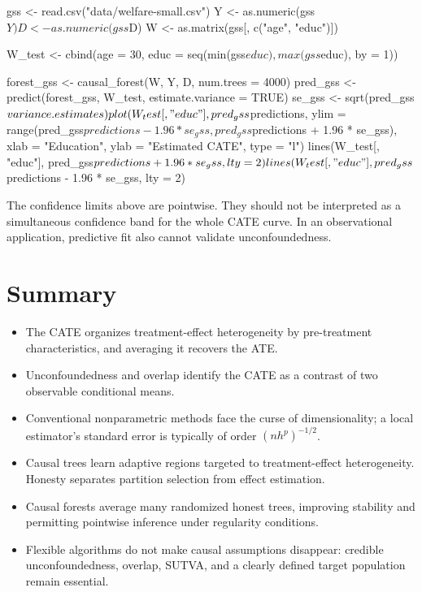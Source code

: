 \begin{rcode}
gss <- read.csv("data/welfare-small.csv")
Y <- as.numeric(gss$Y)
D <- as.numeric(gss$D)
W <- as.matrix(gss[, c("age", "educ")])

W_test <- cbind(age = 30,
                educ = seq(min(gss$educ), max(gss$educ), by = 1))

forest_gss <- causal_forest(W, Y, D, num.trees = 4000)
pred_gss <- predict(forest_gss, W_test, estimate.variance = TRUE)
se_gss <- sqrt(pred_gss$variance.estimates)

plot(W_test[, "educ"], pred_gss$predictions,
     ylim = range(pred_gss$predictions - 1.96 * se_gss,
                  pred_gss$predictions + 1.96 * se_gss),
     xlab = "Education", ylab = "Estimated CATE", type = "l")
lines(W_test[, "educ"], pred_gss$predictions + 1.96 * se_gss, lty = 2)
lines(W_test[, "educ"], pred_gss$predictions - 1.96 * se_gss, lty = 2)
\end{rcode}

The confidence limits above are pointwise.  They should not be interpreted as a
simultaneous confidence band for the whole CATE curve.  In an observational
application, predictive fit also cannot validate unconfoundedness.

\section{Summary}

\begin{itemize}
  \item The CATE organizes treatment-effect heterogeneity by pre-treatment
  characteristics, and averaging it recovers the ATE.
  \item Unconfoundedness and overlap identify the CATE as a contrast of two
  observable conditional means.
  \item Conventional nonparametric methods face the curse of dimensionality; a
  local estimator's standard error is typically of order $(nh^p)^{-1/2}$.
  \item Causal trees learn adaptive regions targeted to treatment-effect
  heterogeneity.  Honesty separates partition selection from effect estimation.
  \item Causal forests average many randomized honest trees, improving stability
  and permitting pointwise inference under regularity conditions.
  \item Flexible algorithms do not make causal assumptions disappear: credible
  unconfoundedness, overlap, SUTVA, and a clearly defined target population remain
  essential.
\end{itemize}
